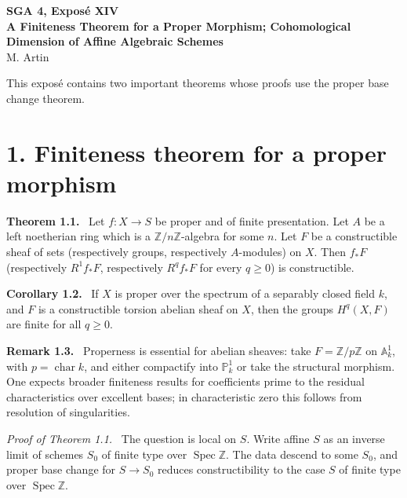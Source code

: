 \documentclass[12pt]{article}
\newcommand{\Zz}{\mathbb{Z}}
\newcommand{\Spec}{\operatorname{Spec}}
\newenvironment{statement}[1]{\par\medskip\noindent\textbf{#1.}\ }{\par\medskip}
\newenvironment{remarktext}[1]{\par\medskip\noindent\textbf{#1.}\ }{\par\medskip}
\newenvironment{prooftext}[1][Proof]{\par\noindent\emph{#1.}\ }{\par\medskip}
\begin{document}
\clearpage
\begin{center}
{\Large \textbf{SGA 4, Expos\'e XIV}}\\[0.35em]
{\large \textbf{A Finiteness Theorem for a Proper Morphism; Cohomological Dimension of Affine Algebraic Schemes}}\\[0.25em]
{\normalsize M. Artin}
\end{center}

This expos\'e contains two important theorems whose proofs use the proper base change theorem.

\section*{1. Finiteness theorem for a proper morphism}

\begin{statement}{Theorem 1.1}
Let \(f:X\to S\) be proper and of finite presentation. Let \(A\) be a left noetherian ring which is a \(\Zz/n\Zz\)-algebra for some \(n\). Let \(F\) be a constructible sheaf of sets (respectively groups, respectively \(A\)-modules) on \(X\). Then \(f_*F\) (respectively \(R^1f_*F\), respectively \(R^qf_*F\) for every \(q\ge0\)) is constructible.
\end{statement}

\begin{statement}{Corollary 1.2}
If \(X\) is proper over the spectrum of a separably closed field \(k\), and \(F\) is a constructible torsion abelian sheaf on \(X\), then the groups \(H^q(X,F)\) are finite for all \(q\ge0\).
\end{statement}

\begin{remarktext}{Remark 1.3}
Properness is essential for abelian sheaves: take \(F=\Zz/p\Zz\) on \(\mathbb A^1_k\), with \(p=\operatorname{char}k\), and either compactify into \(\mathbb P^1_k\) or take the structural morphism. One expects broader finiteness results for coefficients prime to the residual characteristics over excellent bases; in characteristic zero this follows from resolution of singularities.
\end{remarktext}

\begin{prooftext}[Proof of Theorem 1.1]
The question is local on \(S\). Write affine \(S\) as an inverse limit of schemes \(S_0\) of finite type over \(\Spec\Zz\). The data descend to some \(S_0\), and proper base change for \(S\to S_0\) reduces constructibility to the case \(S\) of finite type over \(\Spec\Zz\).
\end{prooftext}
\end{document}
